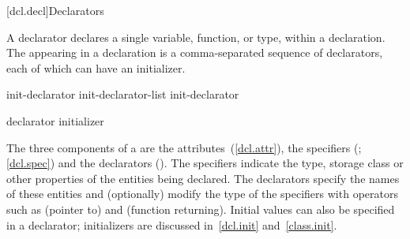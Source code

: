 [dcl.decl]{Declarators}%


%
%
%
%
%

\pnum
A declarator declares a single variable, function, or type, within a declaration.
The
appearing in a declaration
is a comma-separated sequence of declarators,
each of which can have an initializer.

\begin{bnf}
\br
    init-declarator\br
    init-declarator-list \terminal{,} init-declarator
\end{bnf}

\begin{bnf}
\br
    declarator initializer\opt
\end{bnf}

\pnum
The three components of a
are the
attributes~(\ref{dcl.attr}), the
specifiers
(;
\ref{dcl.spec}) and the declarators
().
The specifiers indicate the type, storage class or other properties of
the entities being declared.
The declarators specify the names of these entities
and (optionally) modify the type of the specifiers with operators such as
\tcode{*}
(pointer
to)
and
\tcode{()}
(function returning).
Initial values can also be specified in a declarator;
initializers are discussed in~\ref{dcl.init} and~\ref{class.init}.

